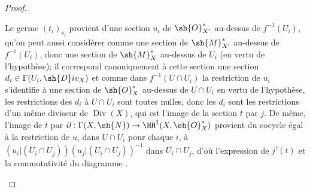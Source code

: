 \begin{proof}
\begin{enumerate}[label=(\roman*)]
Le germe $(t_i)_{s_i}$ provient d'une section $u_i$ de $\sh{O}^*_{X'}$ au-dessus de $f^{-1}(U_i)$, qu'on peut aussi considérer comme une section de $\sh{M}^*_{X'}$ au-dessus de $f^{-1}(U_i)$, donc une section de $\sh{M}^*_X$ au-dessus de $U_i$ (en vertu de l'hypothèse);
il correspond canoniquement à cette section une section $d_i\in\Gamma(U_i,\sh{D}iv_X)$ et comme dans $f^{-1}(U\cap U_i)$ la restriction de $u_i$ s'identifie à une section de $\sh{O}^*_X$ au-dessus de $U\cap U_i$ en vertu de l'hypothèse, les restrictions des $d_i$ à $U\cap U_i$ sont toutes nulles, donc les $d_i$ sont les restrictions d'un même diviseur de $\operatorname{Div}(X)$, qui est l'image de la section $t$ par $j$.
De même, l'image de $t$ par $\partial:\Gamma(X,\sh{N})\to\HH^1(X,\sh{O}^*_X)$ provient du cocycle égal à la restriction de $u_i$ dans $U\cap U_i$ pour chaque $i$, à $(u_i|(U_i\cap U_j))(u_j|(U_i\cap U_j))^{-1}$ dans $U_i\cap U_j$, d'où l'expression de $j'(t)$ et la commutativité du diagramme .
\end{enumerate}
\end{proof}

